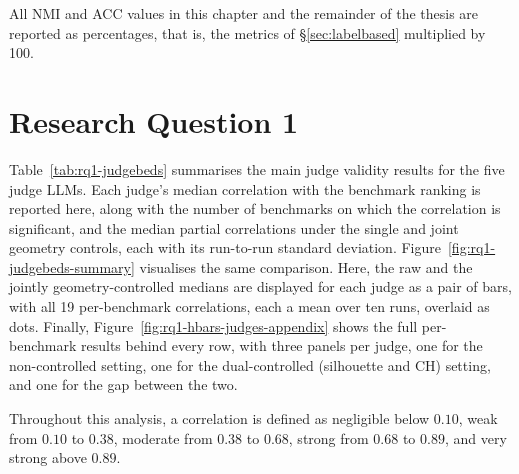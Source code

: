 \documentclass[11pt,a4paper,oneside]{report}
\begin{document}
All NMI and ACC values in this chapter and the remainder of the thesis are reported as percentages, that is, the metrics of \S\ref{sec:labelbased} multiplied by 100. 

\section{Research Question 1}\label{sec:results-rq1}

Table~\ref{tab:rq1-judgebeds} summarises the main judge validity results for the five judge LLMs. Each judge's median correlation with the benchmark ranking is reported here, along with the number of benchmarks on which the correlation is significant, and the median partial correlations under the single and joint geometry controls, each with its run-to-run standard deviation. Figure~\ref{fig:rq1-judgebeds-summary} visualises the same comparison. Here, the raw and the jointly geometry-controlled medians are displayed for each judge as a pair of bars, with all 19 per-benchmark correlations, each a mean over ten runs, overlaid as dots. Finally, Figure~\ref{fig:rq1-hbars-judges-appendix} shows the full per-benchmark results behind every row, with three panels per judge, one for the non-controlled setting, one for the dual-controlled (silhouette and CH) setting, and one for the gap between the two.

Throughout this analysis, a correlation is defined as negligible below $0.10$, weak from $0.10$ to $0.38$, moderate from $0.38$ to $0.68$, strong from $0.68$ to $0.89$, and very strong above $0.89$.
\end{document}
